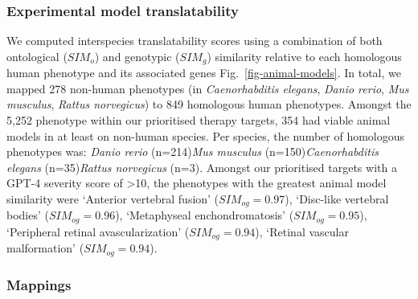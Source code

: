 \documentclass[
]{article}
\begin{document}
\subsubsection{Experimental model
translatability}\label{experimental-model-translatability}

We computed interspecies translatability scores using a combination of
both ontological (\(SIM_{o}\)) and genotypic (\(SIM_{g}\)) similarity
relative to each homologous human phenotype and its associated genes
Fig.~\ref{fig-animal-models}. In total, we mapped 278 non-human
phenotypes (in \emph{Caenorhabditis elegans}, \emph{Danio rerio},
\emph{Mus musculus}, \emph{Rattus norvegicus}) to 849 homologous human
phenotypes. Amongst the 5,252 phenotype within our prioritised therapy
targets, 354 had viable animal models in at least on non-human species.
Per species, the number of homologous phenotypes was: \emph{Danio rerio}
(n=214)\emph{Mus musculus} (n=150)\emph{Caenorhabditis elegans}
(n=35)\emph{Rattus norvegicus} (n=3). Amongst our prioritised targets
with a GPT-4 severity score of \textgreater10, the phenotypes with the
greatest animal model similarity were `Anterior vertebral fusion'
(\(SIM_{og}=0.97\)), `Disc-like vertebral bodies' (\(SIM_{og}=0.96\)),
`Metaphyseal enchondromatosis' (\(SIM_{og}=0.95\)), `Peripheral retinal
avascularization' (\(SIM_{og}=0.94\)), `Retinal vascular malformation'
(\(SIM_{og}=0.94\)).

\newpage{}

\subsubsection{Mappings}\label{mappings}
\end{document}
